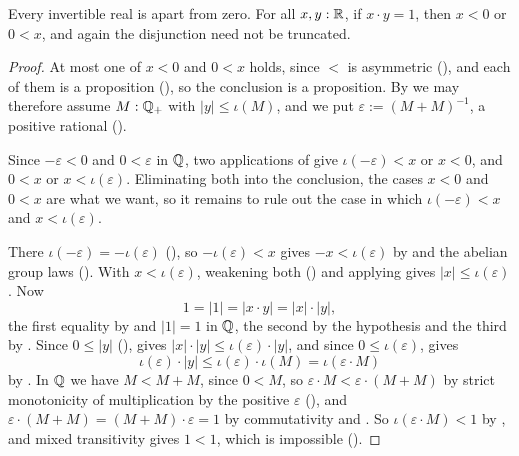\begin{lemma}
  \label{isInvApartZero}
  Every invertible real is apart from zero. For all $x, y : \mathbb{R}$, if $x \cdot y = 1$, then $x < 0$ or $0 < x$, and again the disjunction need not be truncated.
\end{lemma}
\begin{proof}
  At most one of $x < 0$ and $0 < x$ holds, since $<$ is asymmetric (), and each of them is a proposition (), so the conclusion is a proposition. By  we may therefore assume $M : \mathbb{Q}_{+}$ with $\lvert y \rvert \le \iota(M)$, and we put $\varepsilon := (M + M)^{-1}$, a positive rational ().

  Since $-\varepsilon < 0$ and $0 < \varepsilon$ in $\mathbb{Q}$, two applications of  give $\iota(-\varepsilon) < x$ or $x < 0$, and $0 < x$ or $x < \iota(\varepsilon)$. Eliminating both into the conclusion, the cases $x < 0$ and $0 < x$ are what we want, so it remains to rule out the case in which $\iota(-\varepsilon) < x$ and $x < \iota(\varepsilon)$.

  There $\iota(-\varepsilon) = -\iota(\varepsilon)$ (), so $-\iota(\varepsilon) < x$ gives $-x < \iota(\varepsilon)$ by  and the abelian group laws (). With $x < \iota(\varepsilon)$, weakening both () and applying  gives $\lvert x \rvert \le \iota(\varepsilon)$. Now
  \[
    1 = \lvert 1 \rvert = \lvert x \cdot y \rvert = \lvert x \rvert \cdot \lvert y \rvert,
  \]
  the first equality by  and $\lvert 1 \rvert = 1$ in $\mathbb{Q}$, the second by the hypothesis and the third by . Since $0 \le \lvert y \rvert$ (),  gives $\lvert x \rvert \cdot \lvert y \rvert \le \iota(\varepsilon) \cdot \lvert y \rvert$, and since $0 \le \iota(\varepsilon)$,  gives
  \[
    \iota(\varepsilon) \cdot \lvert y \rvert \le \iota(\varepsilon) \cdot \iota(M) = \iota(\varepsilon \cdot M)
  \]
  by . In $\mathbb{Q}$ we have $M < M + M$, since $0 < M$, so $\varepsilon \cdot M < \varepsilon \cdot (M + M)$ by strict monotonicity of multiplication by the positive $\varepsilon$ (), and $\varepsilon \cdot (M + M) = (M + M) \cdot \varepsilon = 1$ by commutativity and . So $\iota(\varepsilon \cdot M) < 1$ by , and mixed transitivity gives $1 < 1$, which is impossible ().
\end{proof}
